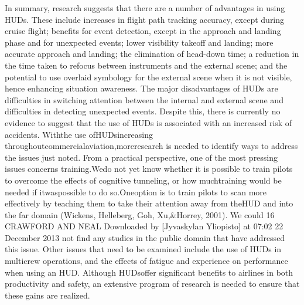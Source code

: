 \documentclass[utf8,bachelor,manualbib]{gradu3}
\begin{document}
In summary, research suggests that there are a number of advantages in using
HUDs. These include increases in flight path tracking accuracy, except during
cruise flight; benefits for event detection, except in the approach and landing
phase and for unexpected events; lower visibility takeoff and landing; more accurate
approach and landing; the elimination of head-down time; a reduction in
the time taken to refocus between instruments and the external scene; and the
potential to use overlaid symbology for the external scene when it is not visible,
hence enhancing situation awareness. The major disadvantages of HUDs are difficulties
in switching attention between the internal and external scene and difficulties
in detecting unexpected events. Despite this, there is currently no evidence
to suggest that the use of HUDs is associated with an increased risk of
accidents.
Withthe use ofHUDsincreasing throughoutcommercialaviation,moreresearch
is needed to identify ways to address the issues just noted. From a practical perspective,
one of the most pressing issues concerns training.Wedo not yet know whether
it is possible to train pilots to overcome the effects of cognitive tunneling, or how
muchtraining would be needed if itwaspossible to do so.Oneoption is to train pilots
to scan more effectively by teaching them to take their attention away from theHUD
and into the far domain (Wickens, Helleberg, Goh, Xu,\&Horrey, 2001). We could
16 CRAWFORD AND NEAL
Downloaded by [Jyvaskylan Yliopisto] at 07:02 22 December 2013
not find any studies in the public domain that have addressed this issue. Other issues
that need to be examined include the use of HUDs in multicrew operations, and the
effects of fatigue and experience on performance when using an HUD. Although
HUDsoffer significant benefits to airlines in both productivity and safety, an extensive
program of research is needed to ensure that these gains are realized. \citep{crawford2006}
\end{document}

